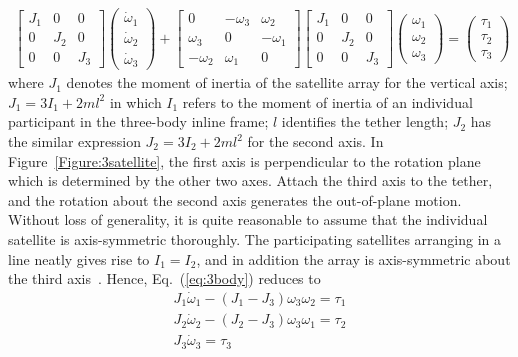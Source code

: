 \begin{align}
\begin{bmatrix}
J_1 &0  &0\\
0   &J_2&0\\
0   &0  &J_3
\end{bmatrix}\begin{pmatrix}
\dot{\omega}_1\\
\dot{\omega}_2\\
\dot{\omega}_3
\end{pmatrix}+\begin{bmatrix}
0   &-\omega_3  &\omega_2\\
\omega_3   &0   &-\omega_1\\
-\omega_2   &\omega_1  &0
\end{bmatrix}\begin{bmatrix}
J_1 &0  &0\\
0   &J_2&0\\
0   &0  &J_3
\end{bmatrix}\begin{pmatrix}
{\omega}_1\\
{\omega}_2\\
{\omega}_3
\end{pmatrix}=\begin{pmatrix}
\tau_1\\
\tau_2\\
\tau_3
\end{pmatrix}\label{eq:3body}
\end{align}
where $J_1$ denotes the moment of inertia of the satellite array for the vertical axis; $J_1=3I_1+2ml^2$ in which $I_1$ refers to the moment of inertia of an individual participant in the three-body inline frame; $l$ identifies the tether length; $J_2$ has the similar expression $J_2=3I_2+2ml^2$ for the second axis. In Figure~\ref{Figure:3satellite}, the first axis is perpendicular to the rotation plane which is determined by the other two axes. Attach the third axis to the tether, and the rotation about the second axis generates the out-of-plane motion. Without loss of generality, it is quite reasonable to assume that the individual satellite is axis-symmetric thoroughly. The participating satellites arranging in a line neatly gives rise to $I_1=I_2$, and in addition the array is axis-symmetric about the third axis~\cite{chung2008propellant1}. Hence, Eq.~(\ref{eq:3body}) reduces to
\begin{align}
J_1\dot{\omega}_1-(J_1-J_3)\omega_3\omega_2=\tau_1\\
J_2\dot{\omega}_2-(J_2-J_3)\omega_3\omega_1=\tau_2\\
J_3\dot{\omega}_3=\tau_3\label{eq:3model}
\end{align}

